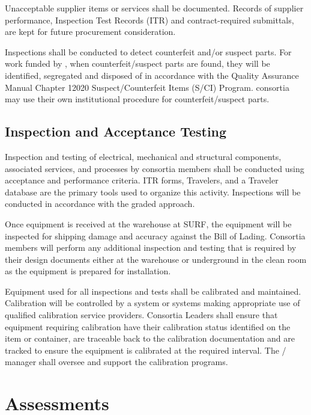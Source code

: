 Unacceptable supplier items or services shall be documented. Records
of supplier performance, Inspection Test Records (ITR) and
contract-required submittals, are kept for future procurement
consideration.

Inspections shall be conducted to detect counterfeit and/or suspect
parts. For work funded by , when counterfeit/suspect parts
are found, they will be identified, segregated and disposed of in
accordance with the \fnal Quality Assurance Manual Chapter 12020
Suspect/Counterfeit Items (S/CI) Program.  consortia may
use their own institutional procedure for counterfeit/suspect parts.

\subsection{Inspection and Acceptance Testing}

Inspection and testing of electrical, mechanical and structural
components, associated services, and processes by consortia members
shall be conducted using acceptance and performance criteria. ITR
forms, Travelers, and a Traveler database are the primary tools used
to organize this activity. Inspections will be conducted in accordance
with the graded approach.

Once equipment is received at the warehouse at SURF, the equipment will 
be inspected for shipping damage and accuracy against the Bill of Lading. 
Consortia members will perform any additional inspection and testing that 
is required by their design documents either at the warehouse or 
underground in the clean room as the equipment is prepared for 
installation.

Equipment used for all inspections and tests shall be calibrated and
maintained. Calibration will be controlled by a system or systems
making appropriate use of qualified calibration service
providers. Consortia Leaders shall ensure that equipment requiring
calibration have their calibration status identified on the item or
container, are traceable back to the calibration documentation and are
tracked to ensure the equipment is calibrated at the required
interval. The /  manager shall
oversee and support the  calibration programs.

\section{Assessments}

